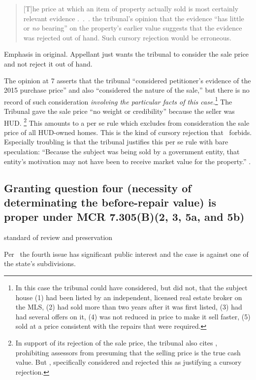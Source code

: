 \documentclass[12pt,\documentclassflag]{michiganCourtOfAppealsBrief}
\begin{document}
\begin{quotation}
  [T]he price at which an item of
  property actually sold is most certainly relevant evidence .~.~.
  the tribunal's opinion that the evidence ``has little or \emph{no}
bearing'' on the property's earlier value suggests that the evidence was rejected out of hand. Such cursory rejection would be erroneous.
\end{quotation}
Emphasis in original. Appellant just wants the tribunal to consider the sale price and not reject it out of hand.

The opinion at 7 asserts that the tribunal ``considered petitioner's evidence of the 2015 purchase price'' and also ``considered the nature of the sale,'' but there is no record of such consideration \emph{involving the particular facts of this case.}\footnote{In this case the tribunal could have considered, but did not, that the subject house (1) had been listed by an independent, licensed real estate broker on the MLS, (2) had sold more than two years after it was first listed, (3) had had several offers on it, (4) was not reduced in price to make it sell faster, (5) sold at a price consistent with the repairs that were required.}
The Tribunal gave the sale price ``no weight or credibility'' because the seller was HUD.%
\footnote{In support of its rejection of the sale price, the tribunal also cites \cite[s]{MCL 211.27(6)}, prohibiting assessors from presuming that the selling price is the true cash value. But , specifically considered and rejected this as justifying a cursory rejection.}
This amounts to a per se rule which excludes from consideration the sale price of all HUD-owned homes. This is the kind of cursory rejection that \cite[s]{Jones & Laughlin}\ forbids. Especially troubling is that the tribunal justifies this per se rule with bare speculation: ``Because the subject was being sold by a government entity, that entity's motivation may
not have been to receive market value for the property.'' .

\subsection{Granting question four (necessity of determinating the before-repair value) is proper under MCR 7.305(B)(2, 3, 5a, and 5b)}

standard of review and preservation

Per \cite{MCR 7.305(B)(2)}\ the fourth issue has significant public interest and the case is against one of the state's subdivisions.
\end{document}
